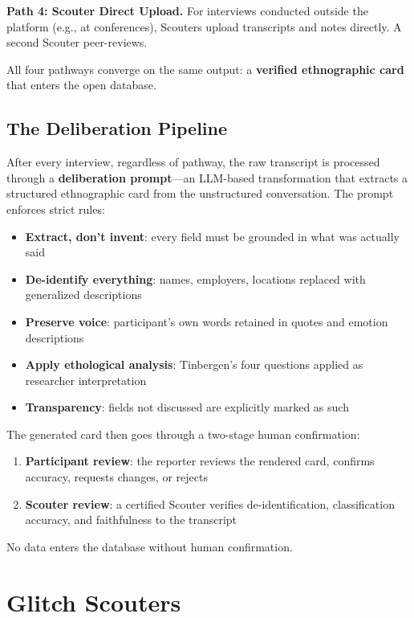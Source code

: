 \documentclass[11pt,a4paper]{article}
\begin{document}
\textbf{Path 4: Scouter Direct Upload.} For interviews conducted outside the platform (e.g., at conferences), Scouters upload transcripts and notes directly. A second Scouter peer-reviews.

All four pathways converge on the same output: a \textbf{verified ethnographic card} that enters the open database.

\subsection{The Deliberation Pipeline}

After every interview, regardless of pathway, the raw transcript is processed through a \textbf{deliberation prompt}---an LLM-based transformation that extracts a structured ethnographic card from the unstructured conversation. The prompt enforces strict rules:

\begin{itemize}[noitemsep]
    \item \textbf{Extract, don't invent}: every field must be grounded in what was actually said
    \item \textbf{De-identify everything}: names, employers, locations replaced with generalized descriptions
    \item \textbf{Preserve voice}: participant's own words retained in quotes and emotion descriptions
    \item \textbf{Apply ethological analysis}: Tinbergen's four questions applied as researcher interpretation
    \item \textbf{Transparency}: fields not discussed are explicitly marked as such
\end{itemize}

The generated card then goes through a two-stage human confirmation:

\begin{enumerate}
    \item \textbf{Participant review}: the reporter reviews the rendered card, confirms accuracy, requests changes, or rejects
    \item \textbf{Scouter review}: a certified Scouter verifies de-identification, classification accuracy, and faithfulness to the transcript
\end{enumerate}

No data enters the database without human confirmation.

\section{Glitch Scouters}
\end{document}

